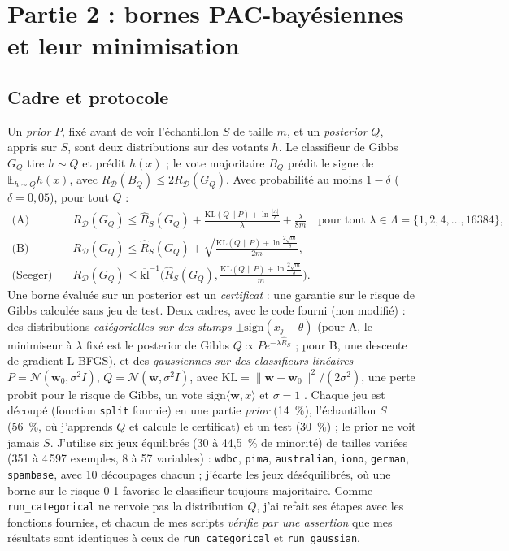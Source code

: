 \documentclass[11pt,a4paper]{article}
\newcommand{\KL}{\mathrm{KL}}
\newcommand{\Rh}{\widehat R}
\newcommand{\risk}{R_{\mathcal D}}
\newcommand{\klinv}{\overline{\mathrm{kl}}^{-1}}
\begin{document}
\section{Partie 2 : bornes PAC-bayésiennes et leur minimisation}
\subsection{Cadre et protocole}
Un \emph{prior} $P$, fixé avant de voir l'échantillon $S$ de taille $m$, et un \emph{posterior} $Q$, appris sur $S$, sont deux distributions sur des votants $h$. Le classifieur de Gibbs $G_Q$ tire $h\sim Q$ et prédit $h(x)$ ; le vote majoritaire $B_Q$ prédit le signe de $\mathbb E_{h\sim Q}h(x)$, avec $\risk(B_Q)\le 2\risk(G_Q)$.
Avec probabilité au moins $1-\delta$ ($\delta=0{,}05$), pour tout $Q$ \cite{mcallester,langford} :
\begin{align*}
\text{(A)}\quad & \risk(G_Q)\le \Rh_S(G_Q)+\frac{\KL(Q\|P)+\ln\frac{|\Lambda|}{\delta}}{\lambda}+\frac{\lambda}{8m}\quad\text{pour tout }\lambda\in\Lambda=\{1,2,4,\dots,16384\},\\
\text{(B)}\quad & \risk(G_Q)\le \Rh_S(G_Q)+\sqrt{\frac{\KL(Q\|P)+\ln\frac{2\sqrt m}{\delta}}{2m}},\\
\text{(Seeger)}\quad & \risk(G_Q)\le \klinv\Big(\Rh_S(G_Q),\frac{\KL(Q\|P)+\ln\frac{2\sqrt m}{\delta}}{m}\Big).
\end{align*}
Une borne évaluée sur un posterior est un \emph{certificat} : une garantie sur le risque de Gibbs calculée sans jeu de test. Deux cadres, avec le code fourni (non modifié) : des distributions \emph{catégorielles sur des stumps} $\pm\mathrm{sign}(x_j-\theta)$ (pour A, le minimiseur à $\lambda$ fixé est le posterior de Gibbs $Q\propto Pe^{-\lambda\Rh_S}$ ; pour B, une descente de gradient L-BFGS), et des
\emph{gaussiennes sur des classifieurs linéaires} $P=\mathcal N(\mathbf w_0,\sigma^2I)$, $Q=\mathcal N(\mathbf w,\sigma^2I)$, avec $\KL=\|\mathbf w-\mathbf w_0\|^2/(2\sigma^2)$, une perte probit pour le risque de Gibbs, un vote $\mathrm{sign}\langle\mathbf w,x\rangle$ et $\sigma=1$ \cite{germain}.
Chaque jeu est découpé (fonction \texttt{split} fournie) en une partie \emph{prior} (14~\%), l'échantillon $S$ (56~\%, où j'apprends $Q$ et calcule le certificat) et un test (30~\%) ; le prior ne voit jamais $S$.
J'utilise six jeux équilibrés (30 à 44,5~\% de minorité) de tailles variées (351 à 4\,597 exemples, 8 à 57 variables) : \texttt{wdbc}, \texttt{pima}, \texttt{australian}, \texttt{iono}, \texttt{german}, \texttt{spambase}, avec 10 découpages chacun ; j'écarte les jeux déséquilibrés, où une borne sur le risque 0-1 favorise le classifieur \og toujours majoritaire\fg{}.
Comme \texttt{run\_categorical} ne renvoie pas la distribution $Q$, j'ai refait ses étapes avec les fonctions fournies, et chacun de mes scripts \emph{vérifie par une assertion} que mes résultats sont identiques à ceux de \texttt{run\_categorical} et \texttt{run\_gaussian}.
\end{document}
